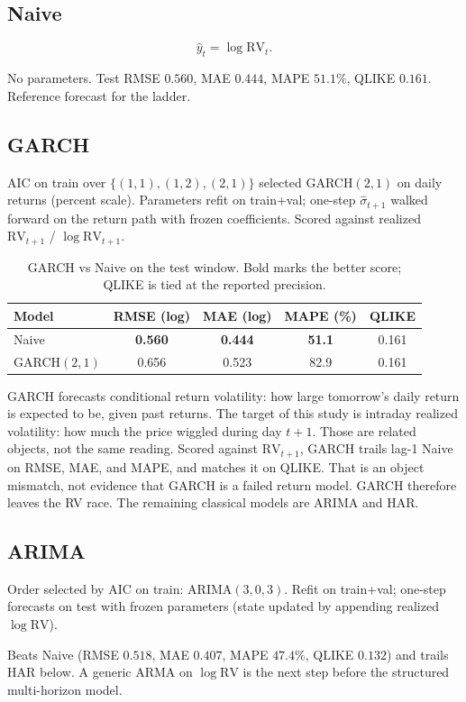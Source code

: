 \documentclass[12pt]{article}
\begin{document}
\subsection{Naive}
\[
\hat y_t=\log\mathrm{RV}_t.
\]
\begin{explain}
No parameters. Test RMSE \(0.560\), MAE \(0.444\), MAPE \(51.1\%\), QLIKE \(0.161\). Reference forecast for the ladder.
\end{explain}

\subsection{GARCH}
AIC on train over \(\{(1,1),(1,2),(2,1)\}\) selected GARCH\((2,1)\) on daily returns (percent scale).
Parameters refit on train+val; one-step \(\hat\sigma_{t+1}\) walked forward on the return path with frozen coefficients.
Scored against realized \(\mathrm{RV}_{t+1}\) / \(\log\mathrm{RV}_{t+1}\).

\begin{table}[H]
\centering
\begin{tabular}{lcccc}
\toprule
Model & RMSE (log) & MAE (log) & MAPE (\%) & QLIKE \\
\midrule
Naive & \textbf{0.560} & \textbf{0.444} & \textbf{51.1} & 0.161 \\
GARCH\((2,1)\) & 0.656 & 0.523 & 82.9 & 0.161 \\
\bottomrule
\end{tabular}
\caption{GARCH vs Naive on the test window. Bold marks the better score; QLIKE is tied at the reported precision.}
\end{table}
\begin{explain}
GARCH forecasts conditional return volatility: how large tomorrow's daily return is expected to be, given past returns.
The target of this study is intraday realized volatility: how much the price wiggled during day \(t+1\).
Those are related objects, not the same reading. Scored against \(\mathrm{RV}_{t+1}\), GARCH trails lag-1 Naive on RMSE, MAE, and MAPE, and matches it on QLIKE.
That is an object mismatch, not evidence that GARCH is a failed return model.
GARCH therefore leaves the RV race. The remaining classical models are ARIMA and HAR.
\end{explain}

\subsection{ARIMA}
Order selected by AIC on train: ARIMA\((3,0,3)\). Refit on train+val; one-step forecasts on test with frozen parameters (state updated by appending realized \(\log\mathrm{RV}\)).
\begin{explain}
Beats Naive (RMSE \(0.518\), MAE \(0.407\), MAPE \(47.4\%\), QLIKE \(0.132\)) and trails HAR below. A generic ARMA on \(\log\mathrm{RV}\) is the next step before the structured multi-horizon model.
\end{explain}
\end{document}
